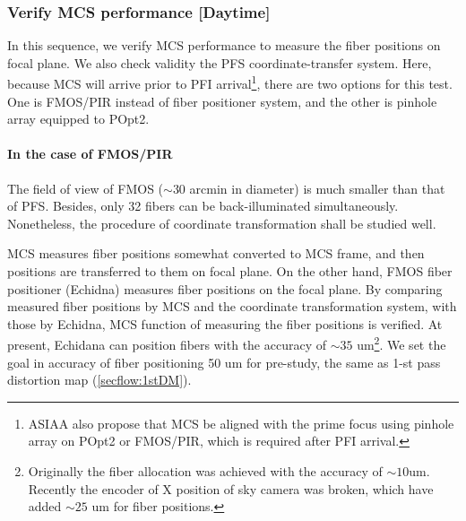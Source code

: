 \subsubsection{Verify MCS performance [Daytime]}\label{secflow:prestudy}
In this sequence, we verify MCS performance to measure the fiber positions on focal plane.
We also check validity the PFS coordinate-transfer system.
Here, because MCS will arrive prior to PFI arrival\footnote{ASIAA also propose that MCS be aligned with the prime focus using pinhole array on POpt2 or FMOS/PIR, which is required after PFI arrival.}, there are two options for this test.
One is FMOS/PIR instead of fiber positioner system, and the other is pinhole array equipped to POpt2.

\paragraph{In the case of FMOS/PIR}
The field of view of FMOS ($\sim 30$ arcmin in diameter) is much smaller than that of PFS.
Besides, only 32 fibers can be back-illuminated simultaneously.
Nonetheless, the procedure of coordinate transformation shall be studied well.

MCS measures fiber positions somewhat converted to MCS frame, and then positions are transferred to them on focal plane.
On the other hand, FMOS fiber positioner (Echidna) measures fiber positions on the focal plane.
By comparing measured fiber positions by MCS and the coordinate transformation system, with those by Echidna, MCS function of measuring the fiber positions is verified.
At present, Echidana can position fibers with the accuracy of $\sim 35$ um\footnote{Originally the fiber allocation was achieved with the accuracy of $\sim 10$um. Recently the encoder of X position of sky camera was broken, which have added $\sim 25$ um for fiber positions.}.
We set the goal in accuracy of fiber positioning 50 um for pre-study, the same as 1-st pass distortion map (\ref{secflow:1stDM}).

